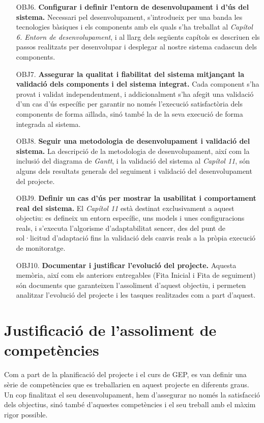 \begin{itemize}
\item[OBJ6.] \textbf{Configurar i definir l’entorn de desenvolupament i d’ús del sistema.}
\subitem Necessari pel desenvolupament, s'introdueix per una banda les tecnologies bàsiques i els components amb els quals s'ha treballat al \textit{Capítol 6. Entorn de desenvolupament}, i al llarg dels següents capítols es descriuen els passos realitzats per desenvolupar i desplegar al nostre sistema cadascun dels components.
\item[OBJ7.] \textbf{Assegurar la qualitat i fiabilitat del sistema mitjançant la validació dels components i del sistema integrat.}
\subitem Cada component s'ha provat i validat independentment, i addicionalment s'ha afegit una validació d'un cas d'ús específic per garantir no només l'execució satisfactòria dels components de forma aïllada, sinó també la de la seva execució de forma integrada al sistema.
\item[OBJ8.] \textbf{Seguir una metodologia de desenvolupament i validació del sistema.}
\subitem La descripció de la metodologia de desenvolupament, així com la inclusió del diagrama de \textit{Gantt}, i la validació del sistema al \textit{Capítol 11}, són alguns dels resultats generals del seguiment i validació del desenvolupament del projecte.
\item[OBJ9.] \textbf{Definir un cas d’ús per mostrar la usabilitat i comportament real del sistema.}
\subitem El \textit{Capítol 11} està destinat exclusivament a aquest objectiu: es defineix un entorn específic, uns models i unes configuracions reals, i s'executa l'algorisme d'adaptabilitat sencer, des del punt de sol·licitud d'adaptació fins la validació dels canvis reals a la pròpia execució de monitoratge.
\item[OBJ10.] \textbf{Documentar i justificar l’evolució del projecte.}
\subitem Aquesta memòria, així com els anteriors entregables (Fita Inicial i Fita de seguiment) són documents que garanteixen l'assoliment d'aquest objectiu, i permeten analitzar l'evolució del projecte i les tasques realitzades com a part d'aquest.
\end{itemize}

\section{Justificació de l'assoliment de competències}

Com a part de la planificació del projecte i el curs de GEP, es van definir una sèrie de competències que es treballarien en aquest projecte en diferents graus. Un cop finalitzat el seu desenvolupament, hem d'assegurar no només la satisfacció dels objectius, sinó també d'aquestes competències i el seu treball amb el màxim rigor possible.

